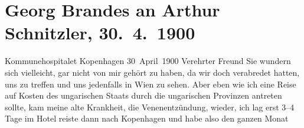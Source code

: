 

         
         \renewcommand{\erwaehntePersonen}{Personen: Honoré de Balzac, Richard Beer-Hofmann, Paul Bourget, Georg Brandes, Paul Goldmann, Theodor Gomperz, Ewelina Hańska, Wilhelm Hegeler, Karl Lanckoroński}
         \renewcommand{\erwaehnteInstitutionen}{Institutionen: Calmann-Lévy, Liberaler Club}
         \renewcommand{\erwaehnteOrte}{Orte: Deutschland, Frankreich, Kommunehospitalet, Kopenhagen, Skandinavien, Ungarn, Wien}
         \renewcommand{\erwaehnteWerke}{Werke: Ein Sommer in China. Reisebilder, Familiendramen, Ingenieur Horstmann, Lettres à l’étrangère (1833–1842), (1842–1844), Rund um die Erde 1888–89, Samlede Skrifter [Gesammelte Werke]}
               \section[Georg Brandes an Arthur Schnitzler, 30. 4. 1900]{ Georg Brandes an Arthur Schnitzler, 30. 4. 1900}\nopagebreak{}\rehead{ }\begin{ledgroupsized}[t]{13cm}\normalsize\beginnumbering{} \toendnotes[C]{\smallbreak\pagebreak[2]} 
\toendnotes[C]{\smallbreak}\pstart
           \raggedleft{}{\pb}Kommunehospitalet\pend
           \pstart
           \raggedleft{}Kopenhagen\pend
           \pstart
           \raggedleft{}30 April 1900\pend
           \pstart{}Verehrter Freund\pend\pstart
           Sie wundern sich vielleicht, gar nicht von mir gehört zu haben, da wir doch
               verabredet hatten, uns zu treffen und uns jedenfalls in Wien zu sehen. Aber eben wie ich eine Reise auf Kosten des ungarischen Staats durch die ungarischen Provinzen antreten sollte, kam meine alte Krankheit,
               die Venenentzündung, wieder, ich lag erst 3–4 Tage im Hotel reiste dann nach Kopenhagen und habe also den ganzen Monat

\end{ledgroupsized}
